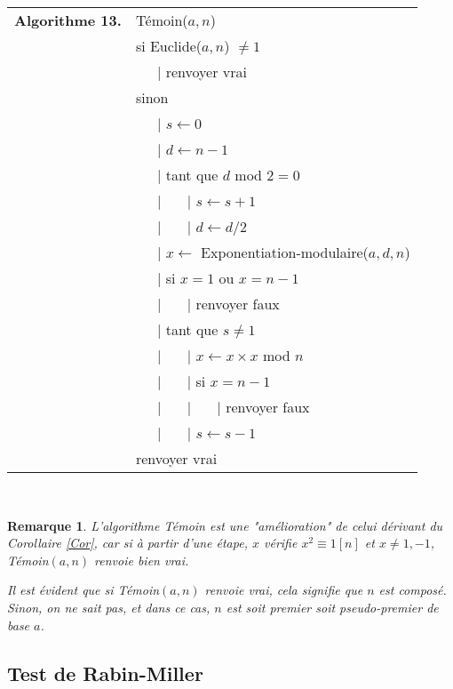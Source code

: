 \documentclass[10pt,a4paper]{report}
\newtheorem*{rem}{Remarque}
\begin{document}
\begin{tabular}{ll}
\textbf{Algorithme 13.} & Témoin($a,n$)\\
           & si Euclide($a,n$) $\neq 1$ \\
           & \ \ \ {\rm |}  renvoyer vrai \\
           & sinon \\
           & \ \ \ {\rm |} $s \leftarrow 0$ \\
           & \ \ \ {\rm |} $d \leftarrow n-1$ \\
           &  \ \ \ {\rm |} tant que $d$ mod $2=0$   \\
           & \ \ \ {\rm |} \ \ \ {\rm |} $s \leftarrow s+1 $\\
           & \ \ \ {\rm |} \ \ \ {\rm |} $d \leftarrow d/2$ \\
           & \ \ \ {\rm |} $x\leftarrow$ Exponentiation-modulaire($a,d,n$) \\           
           &  \ \ \ {\rm |} si $x=1$ ou $x=n-1$ \\
           & \ \ \ {\rm |} \ \ \ {\rm |} renvoyer faux \\
           & \ \ \ {\rm |} tant que $s \neq 1$ \\
           & \ \ \ {\rm |} \ \ \ {\rm |} $ x\leftarrow x \times x$ mod $n$ \\
           & \ \ \ {\rm |} \ \ \ {\rm |} si $x=n-1$ \\
           & \ \ \ {\rm |} \ \ \ {\rm |} \ \ \ {\rm |} renvoyer faux\\
           & \ \ \ {\rm |} \ \ \ {\rm |} $s \leftarrow s-1$ \\         
           & renvoyer vrai  
\end{tabular}\\

\begin{rem}
L'algorithme Témoin est une "amélioration" de celui dérivant du Corollaire \ref{Cor}, car si à partir d'une étape, $x$ vérifie $x^2 \equiv 1 [n]$ et $x \neq 1,-1$, Témoin$(a,n)$ renvoie bien vrai.\par 
Il est évident que si Témoin$(a,n)$ renvoie vrai, cela signifie que $n$ est composé. Sinon, on ne sait pas, et dans ce cas, $n$ est soit premier soit pseudo-premier de base $a$.
\end{rem}

\subsection*{Test de Rabin-Miller}
\end{document}
